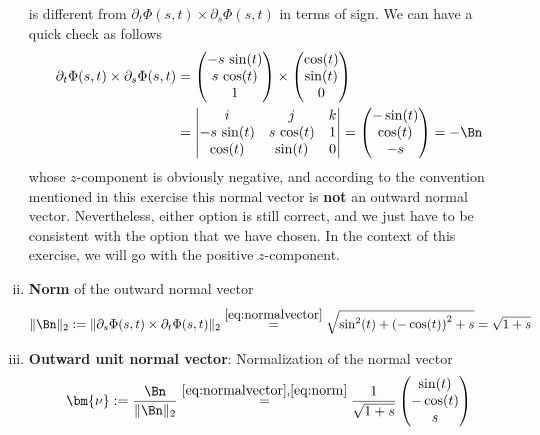 \documentclass[12pt]{article}
\begin{document}
\begin{enumerate}[(i)]
\begin{observationboxed}
		      is different from 
		      $\partial_{t}\Phi(s,t) \times \partial_{s}\Phi(s,t)$
		      in terms of sign. We can have a quick check as follows
		      \begin{align}
			      \partial_{t}\Phi(s,t) \times \partial_{s}\Phi(s,t)
			       & =
			      \begin{pmatrix}
				      -s\,\sin(t) \\ s\,\cos(t) \\ 1
			      \end{pmatrix}
			      \times
			      \begin{pmatrix}
				      \cos(t) \\ \sin(t) \\ 0
			      \end{pmatrix} \\
			       & =
			      \begin{vmatrix}
				      i           & j          & k  \\
				      -s\,\sin(t) & s\,\cos(t) & 1  \\
				      \cos(t)     & \sin(t)    & 0 
			      \end{vmatrix}
			      =
			      \begin{pmatrix}
				      -\sin(t) \\ \cos(t) \\  -s
			      \end{pmatrix}
			      = -\Bn
		      \end{align}
		      whose $z$-component is obviously negative,
		      and according to the convention mentioned in this exercise
		      this normal vector is \textbf{not} an outward normal vector.
		      Nevertheless, either option is still correct,
		      and we just have to be consistent with the 
		      option that we have chosen. 
		      In the context of this exercise,
		      we will go with the positive $z$-component.
	      \end{observationboxed}
	      
	\item \textbf{Norm} of the outward normal vector
	      \begin{align}
		      \label{eq:norm}
		      \| \Bn \|_2 
		      := 
		      \| \partial_{s}\Phi(s,t) \times \partial_{t}\Phi(s,t) \|_2
		      \stackrel{\eqref{eq:normalvector}}{=}
		      \sqrt{\sin^2(t) + \left( - \cos(t)\right)^2 + s}
		      =
		      \sqrt{1+s}
	      \end{align}
	      
	\item \textbf{Outward unit normal vector}: Normalization of the normal vector
	      \begin{align}
		      \label{eq:unitnormalvector}
		      \bm{\nu} := \frac{\Bn}{\| \Bn \|_2 }
		      \stackrel{\eqref{eq:normalvector},\eqref{eq:norm}}{=}
		      \frac{1}{\sqrt{1+s}}
		      \begin{pmatrix}
			      \sin(t) \\ -\cos(t) \\  s
		      \end{pmatrix}
	      \end{align}
	      

\end{enumerate}
\end{document}
